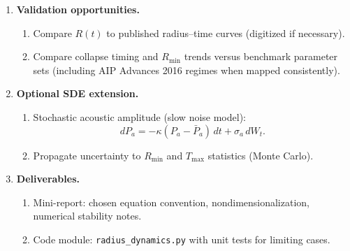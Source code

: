 \documentclass[11pt]{article}
\begin{document}
\begin{enumerate}
		\item \textbf{Validation opportunities.}
		\begin{enumerate}
			\item Compare $R(t)$ to published radius--time curves (digitized if necessary).
			\item Compare collapse timing and $R_{\min}$ trends versus benchmark parameter sets (including AIP Advances 2016 regimes when mapped consistently).
		\end{enumerate}
		
		\item \textbf{Optional SDE extension.}
		\begin{enumerate}
			\item Stochastic acoustic amplitude (slow noise model):
			\[
			dP_a = -\kappa(P_a-\bar P_a)\,dt + \sigma_a\,dW_t.
			\]
			\item Propagate uncertainty to $R_{\min}$ and $T_{\max}$ statistics (Monte Carlo).
		\end{enumerate}
		
		\item \textbf{Deliverables.}
		\begin{enumerate}
			\item Mini-report: chosen equation convention, nondimensionalization, numerical stability notes.
			\item Code module: \texttt{radius\_dynamics.py} with unit tests for limiting cases.
		\end{enumerate}
	\end{enumerate}
	
	\newpage
	
\end{document}
